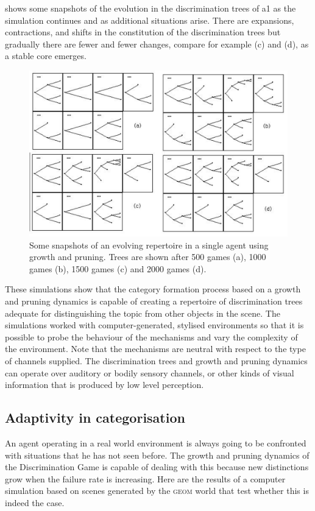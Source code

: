  shows some snapshots of the 
evolution in the discrimination trees of {\bfshape a1} as
the simulation continues and as additional situations
arise. There are
expansions, contractions, and shifts in the constitution of the 
discrimination trees but gradually there are fewer and 
fewer changes, compare for example (c) and (d), as a
stable core emerges. 

\begin{figure}[htbp]
  \centerline{\includegraphics[width=.75\textwidth]{chap4/figs/dynatrees.pdf}}
\caption{\label{dyna-trees}Some snapshots of an evolving 
repertoire in a single agent using growth and pruning. 
Trees are shown after 500 games (a), 1000 games (b), 1500 games
(c) and 2000 games (d).} 
\end{figure}

These simulations show that the
category formation process based on a growth and pruning
dynamics is capable of creating a repertoire of
discrimination trees adequate for distinguishing 
the topic from other objects in the scene. The simulations 
worked with computer-generated, stylised environments
so that it is possible to probe the behaviour of 
the mechanisms and vary the complexity of the environment. 
Note that the mechanisms are neutral with respect 
to the type of channels supplied. The discrimination 
trees and growth and pruning dynamics can operate over
auditory or bodily sensory channels, or other kinds
of visual information that is produced by low level 
perception. 

\subsection{Adaptivity in categorisation}

An agent operating in a real world environment is always
going to be confronted with situations that he has 
not seen before. The growth and pruning dynamics of the 
Discrimination Game is capable of dealing with this because 
new distinctions grow when the failure rate 
is increasing. Here are the results of a computer 
simulation based on scenes generated by the 
\textsc{geom} world that test whether this is indeed the case. 

